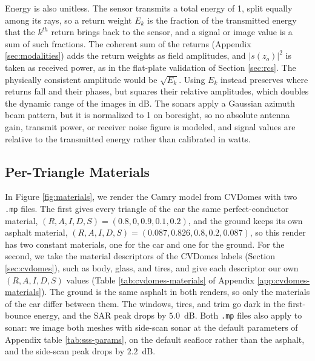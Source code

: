 \documentclass[sensors,article,submit,moreauthors]{Definitions/mdpi}
\begin{document}
Energy is also unitless. The sensor transmits a total energy of 1, split equally
among its rays,
so a return weight $E_k$ is the fraction of the transmitted energy that the
$k^{th}$ return brings
back to the sensor, and a signal or image value is a sum of such fractions. The
coherent sum of the
returns (Appendix \ref{sec:modalities}) adds the return weights as field amplitudes, and
$|s(z_o)|^2$ is taken as
received power, as in the flat-plate validation of Section \ref{sec:rcs}. The
physically
consistent amplitude would be $\sqrt{E_k}$. Using $E_k$ instead preserves where
returns fall and
their phases, but squares their relative amplitudes, which doubles the dynamic
range of the images
in dB. The sonars apply a Gaussian azimuth beam pattern, but it is normalized to
1 on boresight, so
no absolute antenna gain, transmit power, or receiver noise figure is modeled,
and signal values are
relative to the transmitted energy rather than calibrated in watts.

\subsection{Per-Triangle Materials}
\label{sec:per-triangle-materials}

In Figure \ref{fig:materials}, we render the Camry model from CVDomes \cite{cvdomes} with
two \texttt{.mp} files. The first
gives every triangle of the car the same perfect-conductor material,
$(R,A,I,D,S) = (0.8, 0, 0.9,
0.1, 0.2)$, and the ground keeps its own asphalt material, $(R,A,I,D,S) =
(0.087, 0.826, 0.8, 0.2,
0.087)$, so this render has two constant materials, one for the car and one for
the ground. For the
second, we take the material descriptors of the CVDomes labels (Section
\ref{sec:cvdomes}), such as
body, glass, and tires, and give each descriptor our own $(R,A,I,D,S)$ values
(Table
\ref{tab:cvdomes-materials} of Appendix \ref{app:cvdomes-materials}). The ground
is the same asphalt
in both renders, so only the materials of the car differ between them. The
windows, tires, and
trim go dark in the first-bounce energy, and the SAR peak drops by $5.0$~dB.
Both \texttt{.mp} files also apply to sonar: we image both meshes with
side-scan sonar at the default parameters of Appendix table \ref{tab:sss-params}, on the
default seafloor rather than the asphalt, and the side-scan peak drops by
$2.2$~dB.
\end{document}

